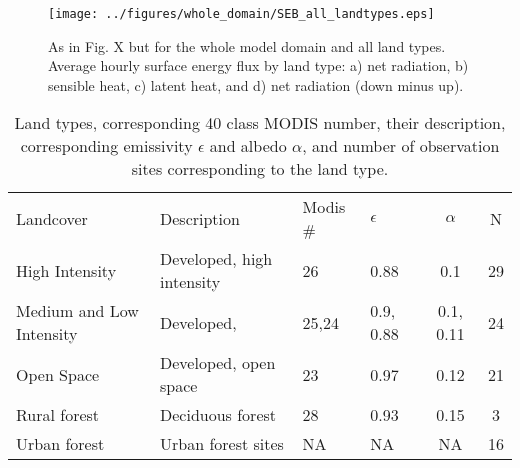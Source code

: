 \documentclass[draft,linenumbers]{agujournal}
\begin{document}
\begin{figure}[h]
\centering
\texttt{[image: ../figures/whole\_domain/SEB\_all\_landtypes.eps]}
\caption{As in Fig. X but for the whole model domain and all land types. Average hourly surface energy flux by land type: a) net radiation, b) sensible heat, c) latent heat, and d) net radiation (down minus up).}
\label{fig:seb_wd}
\end{figure}

%
\begin{table}
\centering
\begin{tabular}{l l l l c c}
Landcover & Description &  Modis \# & $\epsilon$ & $\alpha$ & N  \\
High Intensity & Developed, high intensity & 26& 0.88 &0.1 & 29 \\
Medium and Low Intensity & Developed, & 25,24& 0.9, 0.88 & 0.1, 0.11& 24\\
Open Space& Developed, open space &23 & 0.97 & 0.12 & 21\\
Rural forest&Deciduous forest & 28& 0.93& 0.15& 3\\
Urban forest& Urban forest sites &NA & NA & NA & 16\\
\end{tabular}
\caption{Land types, corresponding 40 class MODIS number, their description, corresponding emissivity $\epsilon$ and albedo $\alpha$, and number of observation sites corresponding to the land type.}
\label{tab:lcc}
\end{table}
\end{document}
